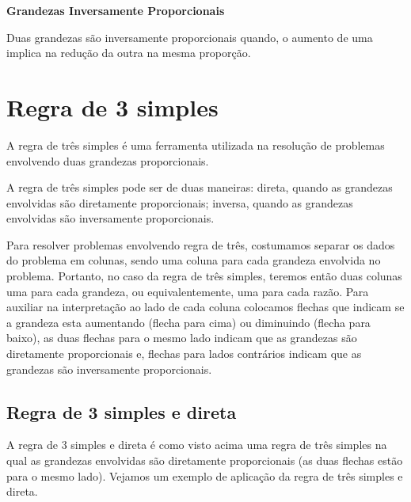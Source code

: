 \colorbox{azul}{
 \begin{minipage}{14.5cm}
 \begin{center}
 \textbf{Grandezas Inversamente Proporcionais}

   Duas grandezas são inversamente proporcionais quando, o aumento de uma implica na redução da outra na mesma proporção.
 \end{center}
 \end{minipage}}

 \vskip0.3cm


\section{Regra de 3 simples}

A regra de três simples é uma ferramenta utilizada na resolução de problemas envolvendo duas grandezas proporcionais.

A regra de três simples pode ser de duas maneiras: direta, quando as grandezas envolvidas são diretamente proporcionais; inversa, quando as grandezas envolvidas são inversamente proporcionais.

Para resolver problemas envolvendo regra de três, costumamos separar os dados do problema em colunas, sendo uma coluna para cada grandeza envolvida no problema. Portanto, no caso da regra de três simples, teremos então duas colunas uma para cada grandeza, ou equivalentemente, uma para cada razão. Para auxiliar na interpretação ao lado de cada coluna colocamos flechas que indicam se a grandeza esta aumentando (flecha para cima) ou diminuindo (flecha para baixo), as duas flechas para o mesmo lado indicam que as grandezas são diretamente proporcionais e, flechas para lados contrários indicam que as grandezas são inversamente proporcionais.

\subsection{Regra de 3 simples e direta}

 A regra de 3 simples e direta é como visto acima uma regra de três simples na qual as grandezas envolvidas são diretamente proporcionais (as duas flechas estão para o mesmo lado). Vejamos um exemplo de aplicação da regra de três simples e direta.

